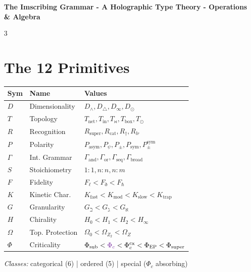 \documentclass[8pt,a4paper,landscape]{article}
\newcommand{\cat}[1]{\textcolor{catblue}{#1}}
\newcommand{\ord}[1]{\textcolor{ordgreen}{#1}}
\newcommand{\spec}[1]{\textcolor{specpurple}{#1}}
\begin{document}
\begin{center}
\LARGE\textbf{The Imscribing Grammar - A Holographic Type Theory - Operations \& Algebra}\\
\end{center}
\vspace{-0.3em}

\begin{multicols}{3}

\section*{The 12 Primitives}
\footnotesize
\renewcommand{\arraystretch}{1.1}
\begin{tabular}{@{}llp{3.8cm}@{}}
\toprule
\textbf{Sym} & \textbf{Name} & \textbf{Values} \\
\midrule
\cat{$D$} & Dimensionality & $D_\wedge,D_\triangle,D_\infty,D_\odot$ \\
\cat{$T$} & Topology & $T_{\text{net}},T_{\text{in}},T_\bowtie,T_{\text{box}},T_\odot$ \\
\cat{$R$} & Recognition & $R_{\text{super}},R_{\text{cat}},R_\dagger,R_{lr}$ \\
\cat{$P$} & Polarity & $P_{\text{asym}},P_\psi,P_\pm,P_{\text{sym}},P_\pm^{\text{sym}}$ \\
\cat{$\Gamma$} & Int. Grammar & $\Gamma_{\text{and}},\Gamma_{\text{or}},\Gamma_{\text{seq}},\Gamma_{\text{broad}}$ \\
\cat{$S$} & Stoichiometry & $1{:}1,n{:}n,n{:}m$ \\
\midrule
\ord{$F$} & Fidelity & $F_\ell<F_\eth<F_\hbar$ \\
\ord{$K$} & Kinetic Char. & $K_{\text{fast}}<K_{\text{mod}}<K_{\text{slow}}<K_{\text{trap}}$ \\
\ord{$G$} & Granularity & $G_\beth<G_\gimel<G_\aleph$ \\
\ord{$H$} & Chirality & $H_0<H_1<H_2<H_\infty$ \\
\ord{$\Omega$} & Top. Protection & $\Omega_0<\Omega_{Z_2}<\Omega_Z$ \\
\midrule
\spec{$\Phi$} & Criticality & $\Phi_{\text{sub}}<\spec{\Phi_c}<\Phi_c^{\text{cx}}<\Phi_{\text{EP}}<\Phi_{\text{super}}$ \\
\bottomrule
\end{tabular}
\renewcommand{\arraystretch}{1.0}

\vspace{0.6em}
\textit{Classes:} \cat{categorical (6)} | \ord{ordered (5)} | \spec{special ($\Phi_c$ absorbing)}


\end{multicols}
\end{document}
